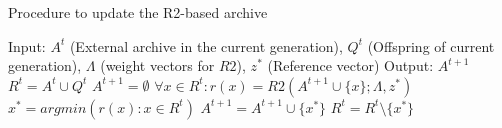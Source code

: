 \begin{algorithm}[!t]
        \caption{Procedure to update the R2-based archive}
        \begin{small}
\begin{algorithmic}[1]
	\STATE Input: $A^t$ (External archive in the current generation), $Q^t$ (Offspring of current generation), $\Lambda$ (weight vectors for $R2$), $z^*$ (Reference vector)
	\STATE Output: $A^{t+1}$
	\STATE $R^t= A^t \cup Q^t$
	\STATE $A^{t+1} = \emptyset$
	\STATE $\forall x \in R^t : r(x) = R2(A^{t+1} \cup \{x\}; \Lambda, z^*)$
	\STATE $x^* = argmin(r(x):x \in R^t)$ 
	\STATE $A^{t+1} = A^{t+1} \cup \{x^*\}$
	\STATE $R^t = R^t \setminus \{ x^* \}$ 
  	\ENDWHILE
        \end{algorithmic}
        \end{small}
\label{alg:r2_Indicator}
\end{algorithm}
